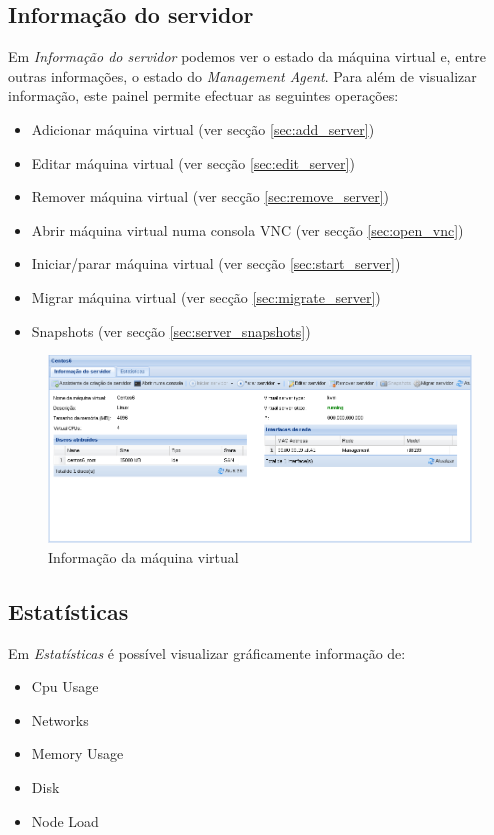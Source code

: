 \subsection{Informação do servidor}
Em \emph{Informação do servidor} podemos ver o estado da máquina virtual e, entre outras informações, o estado do \emph{Management Agent}.
Para além de visualizar informação, este painel permite efectuar as seguintes operações:
\begin{itemize}
	\item Adicionar máquina virtual (ver secção \ref{sec:add_server})
    \item Editar máquina virtual (ver secção \ref{sec:edit_server})
	\item Remover máquina virtual (ver secção \ref{sec:remove_server})
	\item Abrir máquina virtual numa consola VNC (ver secção \ref{sec:open_vnc})
	\item Iniciar/parar máquina virtual (ver secção \ref{sec:start_server})
    \item Migrar máquina virtual (ver secção \ref{sec:migrate_server})
    \item Snapshots (ver secção \ref{sec:server_snapshots})
\end{itemize}

\begin{figure}[H]
	\begin{center}
	\includegraphics[scale=0.45]{screenshots/server_info.png}
	\caption{Informação da máquina virtual}
	\label{fig:server_info}
	\end{center}
\end{figure}

\subsection{Estatísticas}
Em \emph{Estatísticas} é possível visualizar gráficamente informação de:
\begin{itemize}
	\item Cpu Usage
	\item Networks
	\item Memory Usage
	\item Disk
	\item Node Load
\end{itemize}

